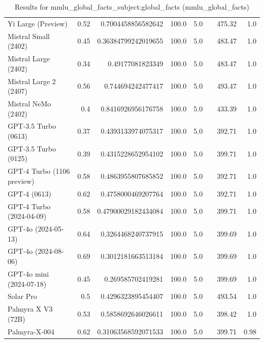 \begin{table}[htp]
{\begin{tabular}{lrrrrrrr}
Yi Large (Preview) & 0.52 & 0.7004458856582642 & 100.0 & 5.0 &  & 475.32 & 1.0 \\
Mistral Small (2402) & 0.45 & 0.36384799242019655 & 100.0 & 5.0 &  & 483.47 & 1.0 \\
Mistral Large (2402) & 0.34 & 0.49177081823349 & 100.0 & 5.0 &  & 483.47 & 1.0 \\
Mistral Large 2 (2407) & 0.56 & 0.744694242477417 & 100.0 & 5.0 &  & 493.47 & 1.0 \\
Mistral NeMo (2402) & 0.4 & 0.8416926956176758 & 100.0 & 5.0 &  & 433.39 & 1.0 \\
GPT-3.5 Turbo (0613) & 0.37 & 0.4393133974075317 & 100.0 & 5.0 &  & 392.71 & 1.0 \\
GPT-3.5 Turbo (0125) & 0.39 & 0.4315228652954102 & 100.0 & 5.0 &  & 399.71 & 1.0 \\
GPT-4 Turbo (1106 preview) & 0.58 & 0.4863955807685852 & 100.0 & 5.0 &  & 392.71 & 1.0 \\
GPT-4 (0613) & 0.62 & 0.4758000469207764 & 100.0 & 5.0 &  & 392.71 & 1.0 \\
GPT-4 Turbo (2024-04-09) & 0.58 & 0.47900029182434084 & 100.0 & 5.0 &  & 399.71 & 1.0 \\
GPT-4o (2024-05-13) & 0.64 & 0.3264468240737915 & 100.0 & 5.0 &  & 399.69 & 1.0 \\
GPT-4o (2024-08-06) & 0.69 & 0.3012181663513184 & 100.0 & 5.0 &  & 399.69 & 1.0 \\
GPT-4o mini (2024-07-18) & 0.45 & 0.269585702419281 & 100.0 & 5.0 &  & 399.69 & 1.0 \\
Solar Pro & 0.5 & 0.4296323895454407 & 100.0 & 5.0 &  & 493.54 & 1.0 \\
Palmyra X V3 (72B) & 0.53 & 0.5858692646026611 & 100.0 & 5.0 &  & 398.42 & 1.0 \\
Palmyra-X-004 & 0.62 & 0.31063568592071533 & 100.0 & 5.0 &  & 399.71 & 0.98 \\
\bottomrule
\end{tabular}}
\caption{Results for mmlu_global_facts_subject:global_facts (mmlu_global_facts)}
\label{fig:mmlu_global_facts_subject:global_facts (mmlu_global_facts)}
\end{table}